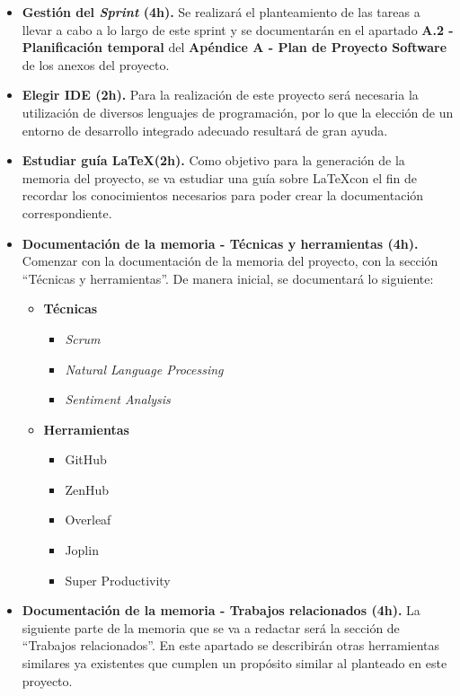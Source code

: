 \begin{itemize}
    \item \textbf{Gestión del \textit{Sprint} (4h).}  Se realizará el planteamiento de las tareas a llevar a cabo a lo largo de este sprint y se documentarán en el apartado \textbf{A.2 - Planificación temporal} del \textbf{Apéndice A - Plan de Proyecto Software} de los anexos del proyecto.

    \item \textbf{Elegir IDE (2h).} Para la realización de este proyecto será necesaria la utilización de diversos lenguajes de programación, por lo que la elección de un entorno de desarrollo integrado adecuado resultará de gran ayuda.

    \item \textbf{Estudiar guía \LaTeX (2h).} Como objetivo para la generación de la memoria del proyecto, se va estudiar una guía sobre \LaTeX con el fin de recordar los conocimientos necesarios para poder crear la documentación correspondiente.
 
    \item \textbf{Documentación de la memoria - Técnicas y herramientas (4h).} Comenzar con la documentación de la memoria del proyecto, con la sección ``Técnicas y herramientas''. De manera inicial, se documentará lo siguiente:

    \begin{itemize}
        \item \textbf{Técnicas}
        \begin{itemize}
            \item \textit{Scrum}
            \item \textit{Natural Language Processing}
            \item \textit{Sentiment Analysis}
        \end{itemize}
        \item \textbf{Herramientas}
        \begin{itemize}
            \item GitHub
            \item ZenHub
            \item Overleaf
            \item Joplin
            \item Super Productivity
        \end{itemize}
    \end{itemize}
    
    \item \textbf{Documentación de la memoria - Trabajos relacionados (4h).} La siguiente parte de la memoria que se va a redactar será la sección de ``Trabajos relacionados''. En este apartado se describirán otras herramientas similares ya existentes que cumplen un propósito similar al planteado en este proyecto.
    

\end{itemize}
